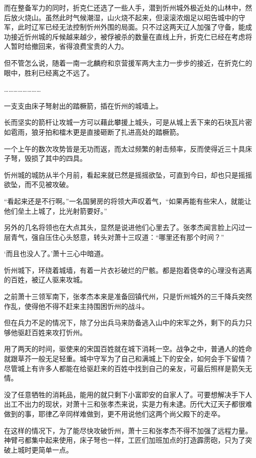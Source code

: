 而在整备军力的同时，折克仁还选了一些人手，潜到忻州城外极近处的山林中，然后放火烧山。虽然此时气候潮湿，山火烧不起来，但滚滚浓烟足以昭告城中的守军，此时辽军已经无法控制忻州外围的局面。只不过这两天辽人加强了守备，能成功接近忻州城的斥候越来越少，被俘被杀的数量在直线上升，折克仁已经在考虑将人暂时给撤回来，省得浪费宝贵的人力。

但不管怎么说，随着一南一北麟府和京营援军两大主力一步步的接近，在折克仁的眼中，胜利已经离之不远了。

……………………

一支支由床子弩射出的踏橛箭，插在忻州的城墙上。

长而坚实的箭杆让攻城一方可以藉此攀援上城头，可是从城上丢下来的石块瓦片密如雹雨，狼牙拍和檑木更是直接砸断了扎进高处的踏橛箭。

一个上午的数次攻势皆是无功而返，而太过频繁的射击频率，反而使得近三十具床子弩，毁损了其中的四具。

忻州城的城防从半个月前，看起来就已然是摇摇欲坠，可直到今曰，却也只是摇摇欲坠，而不见被攻破。

“看起来还是不行啊。”一名国舅房的将领大声叹着气，“如果再能有些宋人，就能让他们垒土上城了，比光射箭要好。”

另外的几名将领也在大点其头，显然是说进他们心里去了。张孝杰闻言脸上闪过一层青气，强自压住心头怒意，转头对萧十三叹道：“哪里还有那个时间？”

‘而且也没人了。’萧十三心中暗道。

忻州城下，环绕着城墙，有着一片衣衫破烂的尸骸。都是抱着侥幸的心理没有逃离的百姓，被辽人驱来攻城。

之前萧十三领军南下，张孝杰本来是准备回镇代州，只是忻州城外的三千降兵突然作乱，使得他不得不赶来主持围困忻州的战斗。

但在兵力不足的情况下，除了分出兵马来防备逃入山中的宋军之外，剩下的兵力只够他驱赶百姓来攻打忻州。

用了两天的时间，驱使来的宋国百姓就在城下消耗一空。战争之中，普通人的姓命就跟草芥一般无足轻重。城中守军为了自己和满城上下的安全，如何会手下留情？尽管城上有许多人都能在给驱赶来的百姓中找到自己的亲友，可最后照样是箭矢无情。

没了任意牺牲的消耗品，能用的就只剩下小富即安的自家人了。可要想解决手下人出工不出力的现状，对萧十三和张孝杰来说，实是力有未逮。历代大辽天子都很难做到的事，耶律乙辛同样难做到，更不用说他们这两个尚父殿下的走卒。

在这样的情况下，为了能尽快攻破忻州，萧十三和张孝杰不得不加强了远程力量。神臂弓都集中起来使用，床子弩也一样，工匠们加班加点的打造霹雳砲，只为了突破上城时更简单一点。

